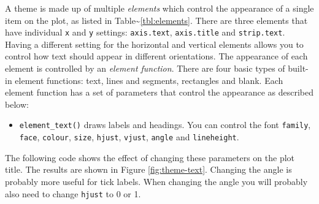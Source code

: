 
A theme is made up of multiple \emph{elements} which control the
appearance of a single item on the plot, as listed in
Table\textasciitilde{}\ref{tbl:elements}. There are three elements that
have individual \texttt{x} and \texttt{y} settings: \texttt{axis.text},
\texttt{axis.title} and \texttt{strip.text}. Having a different setting
for the horizontal and vertical elements allows you to control how text
should appear in different orientations. The appearance of each element
is controlled by an \emph{element function}. 
There are four basic types of built-in element functions: text, lines
and segments, rectangles and blank. Each element function has a set of
parameters that control the appearance as described below:

\begin{itemize}
\itemsep1pt\parskip0pt
\item
  \texttt{element\_text()} draws labels and headings. You can control
  the font \texttt{family}, \texttt{face}, \texttt{colour},
  \texttt{size}, \texttt{hjust}, \texttt{vjust}, \texttt{angle} and
  \texttt{lineheight}.  
\end{itemize}

The following code shows the effect of changing these parameters on the
plot title. The results are shown in Figure \ref{fig:theme-text}.
Changing the angle is probably more useful for tick labels. When
changing the angle you will probably also need to change \texttt{hjust}
to 0 or 1.

